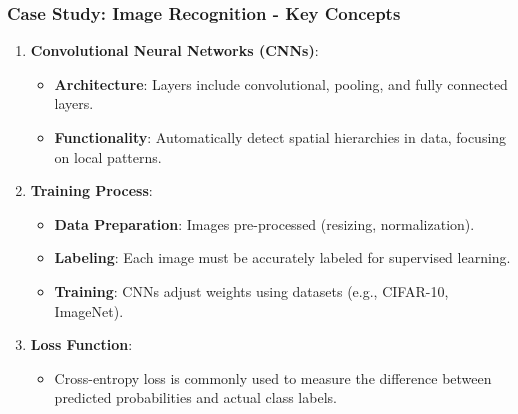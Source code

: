 \documentclass[aspectratio=169]{beamer}
\begin{document}
\begin{frame}[fragile]
    \frametitle{Case Study: Image Recognition - Key Concepts}
    \begin{enumerate}
        \item \textbf{Convolutional Neural Networks (CNNs)}:
        \begin{itemize}
            \item \textbf{Architecture}: Layers include convolutional, pooling, and fully connected layers.
            \item \textbf{Functionality}: Automatically detect spatial hierarchies in data, focusing on local patterns.
        \end{itemize}
        
        \item \textbf{Training Process}:
        \begin{itemize}
            \item \textbf{Data Preparation}: Images pre-processed (resizing, normalization).
            \item \textbf{Labeling}: Each image must be accurately labeled for supervised learning.
            \item \textbf{Training}: CNNs adjust weights using datasets (e.g., CIFAR-10, ImageNet).
        \end{itemize}
        
        \item \textbf{Loss Function}: 
        \begin{itemize}
            \item Cross-entropy loss is commonly used to measure the difference between predicted probabilities and actual class labels.
        \end{itemize}
    \end{enumerate}
\end{frame}
\end{document}
